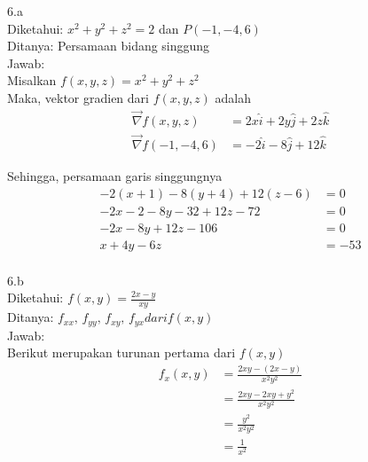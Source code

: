 \documentclass{article}
\begin{document}
    6.a \\
    Diketahui: \(x^2 + y^2 + z^2 = 2 \) dan \(P(-1, -4, 6)\) \\
    Ditanya: Persamaan bidang singgung \\
    Jawab: \\
    Misalkan \(f(x, y, z) = x^2 + y^2 + z^2 \) \\
    Maka, vektor gradien dari \(f(x, y, z)\) adalah \\
    \begin{displaymath}
        \begin{split}
            \vec \nabla f(x, y, z) &= 2x \hat i + 2y \hat j + 2z \hat k \\
            \vec \nabla f(-1, -4, 6) &= -2 \hat i - 8 \hat j + 12 \hat k
        \end{split}
    \end{displaymath}

    Sehingga, persamaan garis singgungnya
    \begin{displaymath}
        \begin{split}
            -2(x + 1) - 8(y + 4) + 12(z - 6) &= 0 \\
            -2x - 2 - 8y - 32 + 12z - 72 &= 0 \\
            -2x - 8y + 12z - 106 &= 0 \\
            x + 4y - 6z &= -53 \\
        \end{split}
    \end{displaymath}

    6.b \\
    Diketahui: \(f(x, y) = \frac{2x - y}{xy} \) \\
    Ditanya: \(f_{xx}, \, f_{yy}, \, f_{xy}, \, f_{yx} dari f(x, y)\) \\
    Jawab: \\
    Berikut merupakan turunan pertama dari \(f(x, y)\) \\
    \begin{displaymath}
        \begin{split}
            f_x(x, y) &= \frac{2xy - (2x - y)}{x^2y^2} \\
            &= \frac{2xy - 2xy + y^2}{x^2y^2} \\
            &= \frac{y^2}{x^2y^2} \\
            &= \frac{1}{x^2}
        \end{split}
    \end{displaymath}
\end{document}
